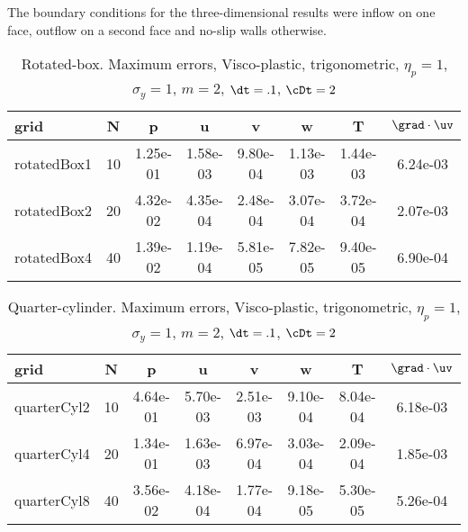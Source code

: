 The boundary conditions for the three-dimensional results were
inflow on one face, outflow on a second face and no-slip walls otherwise.

\begin{table}[hbt]
\begin{center}
\begin{tabular}{|l|c|c|c|c|c|c|c|} \hline
grid        & N       &  p      &  u       & v        & w        &  T       & $\grad\cdot\uv$\\ \hline 
rotatedBox1 & 10    & 1.25e-01 & 1.58e-03 & 9.80e-04 & 1.13e-03 & 1.44e-03 &  6.24e-03 \\
rotatedBox2 & 20    & 4.32e-02 & 4.35e-04 & 2.48e-04 & 3.07e-04 & 3.72e-04 &  2.07e-03 \\
rotatedBox4 & 40    & 1.39e-02 & 1.19e-04 & 5.81e-05 & 7.82e-05 & 9.40e-05 &  6.90e-04 \\\hline 
\end{tabular}
\caption{Rotated-box. Maximum errors, Visco-plastic, trigonometric, $\eta_p=1$, $\sigma_y=1$, $m=2$, $\dt=.1$,
$\cDt=2$}
\label{table:vp.rotatedBox}
\end{center}
\end{table}

\begin{table}[hbt]
\begin{center}
\begin{tabular}{|l|c|c|c|c|c|c|c|} \hline
grid        & N       &  p      &  u       & v        & w        &  T       & $\grad\cdot\uv$\\ \hline 
quarterCyl2 & 10    & 4.64e-01 & 5.70e-03 & 2.51e-03 & 9.10e-04 & 8.04e-04 & 6.18e-03 \\
quarterCyl4 & 20    & 1.34e-01 & 1.63e-03 & 6.97e-04 & 3.03e-04 & 2.09e-04 & 1.85e-03 \\
quarterCyl8 & 40    & 3.56e-02 & 4.18e-04 & 1.77e-04 & 9.18e-05 & 5.30e-05 & 5.26e-04 \\ \hline 
\end{tabular}
\caption{Quarter-cylinder. Maximum errors, Visco-plastic, trigonometric, $\eta_p=1$, $\sigma_y=1$, $m=2$, $\dt=.1$, 
$\cDt=2$}
\label{table:vp.quarterCyl}
\end{center}
\end{table}

